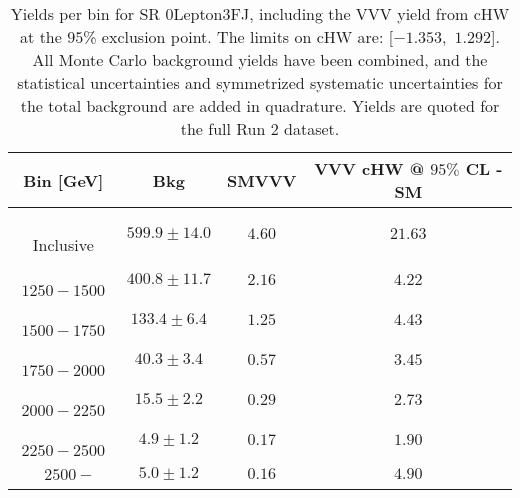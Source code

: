 \begin{table}[!htbp]
    \small
    \center
    \begin{tabular}{c||c|c|c}
    Bin [GeV] & Bkg & SMVVV & \pbox{20cm}{VVV \\ cHW @ $95\%$ CL - SM \\ }\\
    \hline
    \pbox{20cm}{ ~ \\Inclusive\\ } & $599.9 \pm 14.0$ & $4.60$ & $21.63$\\
    \hline
    \pbox{20cm}{ ~ \\$1250-1500$\\ } & $400.8 \pm 11.7$ & $2.16$ & $4.22$\\
    \hline
    \pbox{20cm}{ ~ \\$1500-1750$\\ } & $133.4 \pm 6.4$ & $1.25$ & $4.43$\\
    \hline
    \pbox{20cm}{ ~ \\$1750-2000$\\ } & $40.3 \pm 3.4$ & $0.57$ & $3.45$\\
    \hline
    \pbox{20cm}{ ~ \\$2000-2250$\\ } & $15.5 \pm 2.2$ & $0.29$ & $2.73$\\
    \hline
    \pbox{20cm}{ ~ \\$2250-2500$\\ } & $4.9 \pm 1.2$ & $0.17$ & $1.90$\\
    \hline
    \pbox{20cm}{ ~ \\$2500-$\\ } & $5.0 \pm 1.2$ & $0.16$ & $4.90$\\
\end{tabular}
    \caption{Yields per bin for SR 0Lepton3FJ, including the VVV yield from cHW at the $95$\% exclusion point. The limits on cHW are: [$-1.353$,~$1.292$]. All Monte Carlo background yields have been combined, and the statistical uncertainties and symmetrized systematic uncertainties for the total background are added in quadrature. Yields are quoted for the full Run 2 dataset.}
    \label{tab:0Lepton3FJ$binssignal}
\end{table}
